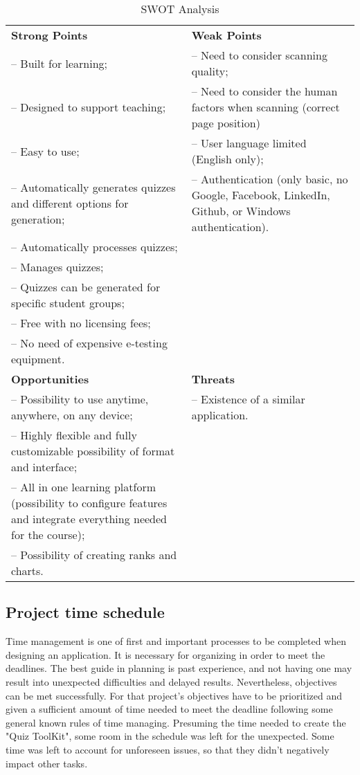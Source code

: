 \begin{table}[ht!]
\centering
\caption{SWOT Analysis}
{
\renewcommand{\arraystretch}{2}
\begin{tabular}{ p{8cm} p{8cm} }

  {\bf Strong  Points } & {\bf Weak Points }\\
  -- Built for learning; & 
  -- Need to consider scanning quality; \\
  -- Designed to support teaching; & 
  -- Need to consider the human factors when scanning (correct page position) \\
  -- Easy to use; & 
  -- User language limited (English only); \\
  -- Automatically generates quizzes and different options for generation; & 
  -- Authentication (only basic, no Google, Facebook, LinkedIn, Github, or Windows authentication). \\
  -- Automatically processes quizzes; \\
  -- Manages quizzes; \\
  -- Quizzes can be generated for specific student groups; \\
  -- Free with no licensing fees; \\
  -- No need of expensive e-testing equipment. \\

  {\bf Opportunities }& {\bf Threats } \\
  -- Possibility to use anytime, anywhere, on any device; &
  -- Existence of a similar application. \\
  -- Highly flexible and fully customizable possibility of format and interface; \\
  -- All in one learning platform (possibility to configure features and integrate everything needed for the course); \\
  -- Possibility of creating ranks and charts. \\

\end{tabular}
}
\label{swot_analysis}
\end{table}

\subsection{Project time schedule}
Time management is one of first and important processes to be completed when designing an application. It is necessary for organizing in order to meet the deadlines. The best guide in planning is past experience, and not having one may result into unexpected difficulties and delayed results. Nevertheless, objectives can be met successfully. For that project’s objectives have to be prioritized and given a sufficient amount of time needed to meet the deadline following some general known rules of time managing. Presuming the time needed to create the "Quiz ToolKit", some room in the schedule was left for the unexpected. Some time was left to account for unforeseen issues, so that they didn't negatively impact other tasks.
